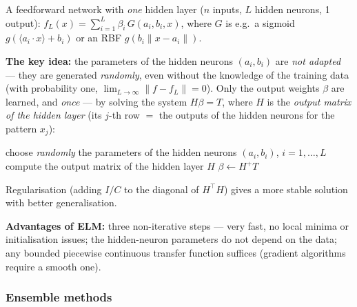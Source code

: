 \documentclass[11pt,a4paper]{article}
\theoremstyle{definition}
\begin{document}
\begin{defbox}
A feedforward network with \emph{one} hidden layer ($n$ inputs, $L$ hidden neurons, 1 output):
$f_L(x)=\sum_{i=1}^{L}\beta_i\,G(a_i,b_i,x)$, where $G$ is e.g.\ a sigmoid
$g(\langle a_i\cdot x\rangle+b_i)$ or an RBF $g(b_i\|x-a_i\|)$.

\textbf{The key idea:} the parameters of the hidden neurons $(a_i,b_i)$ are \emph{not
adapted} --- they are generated \emph{randomly}, even without the knowledge of the training
data (with probability one, $\lim_{L\to\infty}\|f-f_L\|=0$). Only the output weights $\beta$
are learned, and \emph{once} --- by solving the system $H\beta=T$, where $H$ is the
\emph{output matrix of the hidden layer} (its $j$-th row $=$ the outputs of the hidden
neurons for the pattern $x_j$):
\begin{algorithmic}[1]
\State choose \emph{randomly} the parameters of the hidden neurons $(a_i,b_i)$, $i=1,\dots,L$
\State compute the output matrix of the hidden layer $H$
\State $\beta\gets H^{+}T$ 
\end{algorithmic}
Regularisation (adding $I/C$ to the diagonal of $H^{\!\top}H$) gives a more stable solution
with better generalisation.
\end{defbox}

\textbf{Advantages of ELM:} three non-iterative steps --- very fast, no local minima or
initialisation issues; the hidden-neuron parameters do not depend on the data; any bounded
piecewise continuous transfer function suffices (gradient algorithms require a smooth one).

\subsubsection{Ensemble methods}
\end{document}
